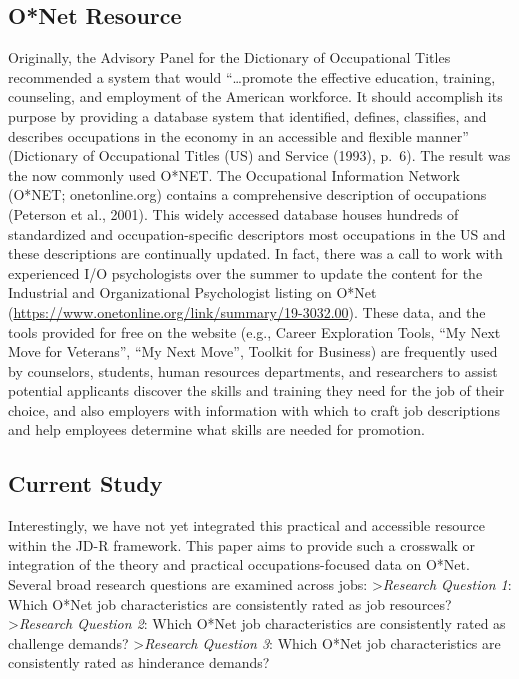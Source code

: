\documentclass[
  english,
  man]{apa6}
\begin{document}
\hypertarget{onet-resource}{%
\subsection{O*Net Resource}\label{onet-resource}}

Originally, the Advisory Panel for the Dictionary of Occupational Titles recommended a system that would \enquote{\ldots promote the effective education, training, counseling, and employment of the American workforce. It should accomplish its purpose by providing a database system that identified, defines, classifies, and describes occupations in the economy in an accessible and flexible manner} (Dictionary of Occupational Titles (US) and Service (1993), p.~6). The result was the now commonly used O*NET. The Occupational Information Network (O*NET; onetonline.org) contains a comprehensive description of occupations (Peterson et al., 2001). This widely accessed database houses hundreds of standardized and occupation-specific descriptors most occupations in the US and these descriptions are continually updated. In fact, there was a call to work with experienced I/O psychologists over the summer to update the content for the Industrial and Organizational Psychologist listing on O*Net (\url{https://www.onetonline.org/link/summary/19-3032.00}). These data, and the tools provided for free on the website (e.g., Career Exploration Tools, \enquote{My Next Move for Veterans}, \enquote{My Next Move}, Toolkit for Business) are frequently used by counselors, students, human resources departments, and researchers to assist potential applicants discover the skills and training they need for the job of their choice, and also employers with information with which to craft job descriptions and help employees determine what skills are needed for promotion.

\hypertarget{current-study}{%
\subsection{Current Study}\label{current-study}}

Interestingly, we have not yet integrated this practical and accessible resource within the JD-R framework. This paper aims to provide such a crosswalk or integration of the theory and practical occupations-focused data on O*Net. Several broad research questions are examined across jobs:
\textgreater{}\emph{Research Question 1}: Which O*Net job characteristics are consistently rated as job resources?
\textgreater{}\emph{Research Question 2}: Which O*Net job characteristics are consistently rated as challenge demands?
\textgreater{}\emph{Research Question 3}: Which O*Net job characteristics are consistently rated as hinderance demands?
\end{document}
